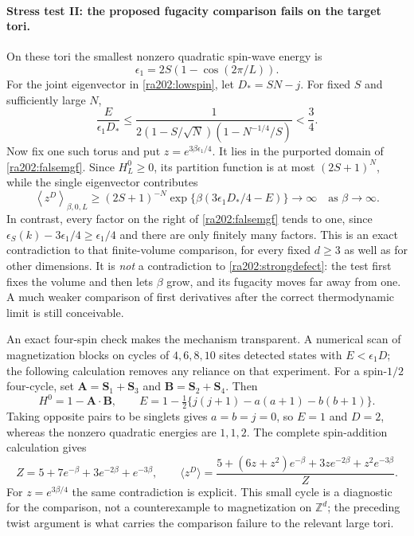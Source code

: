\documentclass[11pt]{article}
\newcommand{\Z}{\mathbb{Z}}
\begin{document}
	\paragraph{Stress test II: the proposed fugacity comparison fails on the target tori.}
	On these tori the smallest nonzero quadratic spin-wave energy is
	\[
	\epsilon_1=2S(1-\cos(2\pi/L)).
	\]
	For the joint eigenvector in \eqref{ra202:lowspin}, let $D_*=SN-j$.
	For fixed $S$ and sufficiently large $N$,
	\begin{equation}\label{ra202:halfgap}
		\frac{E}{\epsilon_1D_*}
		\leq\frac{1}
		{2(1-S/\sqrt N)(1-N^{-1/4}/S)}<\frac34.
	\end{equation}
	Now fix one such torus and put $z=e^{3\beta\epsilon_1/4}$.
	It lies in the purported domain of \eqref{ra202:falsemgf}. Since
	$H_L^0\geq0$, its partition function is at most $(2S+1)^N$, while the
	single eigenvector contributes
	\[
	\left\langle z^D\right\rangle_{\beta,0,L}
	\geq (2S+1)^{-N}
	\exp\{\beta(3\epsilon_1D_*/4-E)\}
	\longrightarrow\infty
	\quad\text{as }\beta\to\infty.
	\]
	In contrast, every factor on the right of \eqref{ra202:falsemgf} tends
	to one, since $\epsilon_S(k)-3\epsilon_1/4\geq\epsilon_1/4$ and
	there are only finitely many factors. This is an exact contradiction
	to that finite-volume comparison, for every fixed $d\geq3$ as well as
	for other dimensions. It is \emph{not} a contradiction to
	\eqref{ra202:strongdefect}: the test first fixes the volume and then
	lets $\beta$ grow, and its fugacity moves far away from one.
	A much weaker comparison of first derivatives after the correct
	thermodynamic limit is still conceivable.
	
	An exact four-spin check makes the mechanism transparent. A numerical
	scan of magnetization blocks on cycles of $4,6,8,10$ sites detected
	states with $E<\epsilon_1D$; the following calculation
	removes any reliance on that experiment. For a spin-$1/2$ four-cycle,
	set $\mathbf A=\mathbf S_1+\mathbf S_3$ and
	$\mathbf B=\mathbf S_2+\mathbf S_4$. Then
	\[
	H^0=1-\mathbf A\cdot\mathbf B,
	\qquad E=1-\tfrac12\{j(j+1)-a(a+1)-b(b+1)\}.
	\]
	Taking opposite pairs to be singlets gives $a=b=j=0$, so $E=1$ and
	$D=2$, whereas the nonzero quadratic energies are $1,1,2$. The complete
	spin-addition calculation gives
	\[
	Z=5+7e^{-\beta}+3e^{-2\beta}+e^{-3\beta},\qquad
	\langle z^D\rangle=
	\frac{5+(6z+z^2)e^{-\beta}+3ze^{-2\beta}+z^2e^{-3\beta}}{Z}.
	\]
	For $z=e^{3\beta/4}$ the same contradiction is explicit. This small
	cycle is a diagnostic for the comparison, not a counterexample to
	magnetization on $\Z^d$; the preceding twist argument is what carries
	the comparison failure to the relevant large tori.
	
\end{document}
